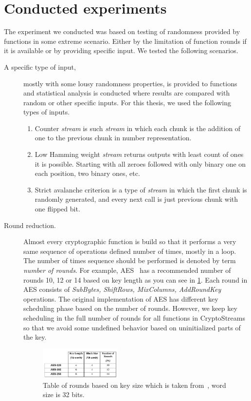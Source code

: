 \documentclass[
    digital,    %
    oneside,    %
    color,
    11pt,
    nocover,
    notable,
    nolof,
    nolot,
    final
]{fithesis3}
\renewcommand\_{\textunderscore\allowbreak}
\begin{document}
\section{Conducted experiments}

The experiment we conducted was based on testing of randomness provided by functions in some extreme scenario. Either by the limitation of function rounds if it is available or by providing specific input. We tested the following scenarios.

\begin{description}
	\item[A specific type of input,] mostly with some lousy randomness properties, is provided to functions and statistical analysis is conducted where results are compared with random or other specific inputs. For this thesis, we used the following types of inputs.
	\begin{enumerate}
		\item Counter \textit{stream} is such \textit{stream} in which each chunk is the addition of one to the previous chunk in number representation.
		\item Low Hamming weight \textit{stream} returns outputs with least count of ones it is possible. Starting with all zeroes followed with only binary one on each position, two binary ones, etc.
		\item Strict avalanche criterion is a type of \textit{stream} in which the first chunk is randomly generated, and every next call is just previous chunk with one flipped bit.
	\end{enumerate}

	\item[Round reduction.] Almost every cryptographic function is build so that it performs a very same sequence of operations defined number of times, mostly in a loop. The number of times sequence should be performed is denoted by term \textit{number of rounds}. For example, AES~\cite{FIPS-197} has a recommended number of rounds 10, 12 or 14 based on key length as you can see in \cref{fig:fips197-rounds}. Each round in AES consists of \textit{SubBytes, ShiftRows, MixColumns, AddRoundKey} operations. The original implementation of AES has different key scheduling phase based on the number of rounds. However, we keep key scheduling in the full number of rounds for all functions in CryptoStreams so that we avoid some undefined behavior based on uninitialized parts of the key.
	
	\begin{figure}[h]
		\centering
		\includegraphics[width=0.4\textwidth]{./images/pictures/FIPS197-Nr-table.png}
		\caption{Table of rounds based on key size which is taken from~\cite{FIPS-197}, word size is 32 bits.}
		\label{fig:fips197-rounds}
	\end{figure}


\end{description}
\end{document}
